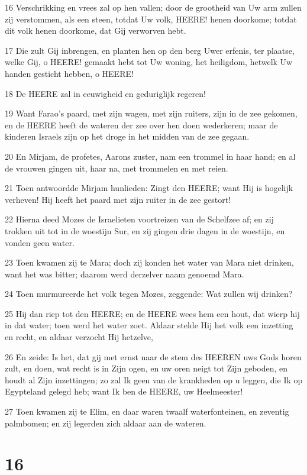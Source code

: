 \par 16 Verschrikking en vrees zal op hen vallen; door de grootheid van Uw arm zullen zij verstommen, als een steen, totdat Uw volk, HEERE! henen doorkome; totdat dit volk henen doorkome, dat Gij verworven hebt.
\par 17 Die zult Gij inbrengen, en planten hen op den berg Uwer erfenis, ter plaatse, welke Gij, o HEERE! gemaakt hebt tot Uw woning, het heiligdom, hetwelk Uw handen gesticht hebben, o HEERE!
\par 18 De HEERE zal in eeuwigheid en geduriglijk regeren!
\par 19 Want Farao's paard, met zijn wagen, met zijn ruiters, zijn in de zee gekomen, en de HEERE heeft de wateren der zee over hen doen wederkeren; maar de kinderen Israels zijn op het droge in het midden van de zee gegaan.
\par 20 En Mirjam, de profetes, Aarons zuster, nam een trommel in haar hand; en al de vrouwen gingen uit, haar na, met trommelen en met reien.
\par 21 Toen antwoordde Mirjam hunlieden: Zingt den HEERE; want Hij is hogelijk verheven! Hij heeft het paard met zijn ruiter in de zee gestort!
\par 22 Hierna deed Mozes de Israelieten voortreizen van de Schelfzee af; en zij trokken uit tot in de woestijn Sur, en zij gingen drie dagen in de woestijn, en vonden geen water.
\par 23 Toen kwamen zij te Mara; doch zij konden het water van Mara niet drinken, want het was bitter; daarom werd derzelver naam genoemd Mara.
\par 24 Toen murmureerde het volk tegen Mozes, zeggende: Wat zullen wij drinken?
\par 25 Hij dan riep tot den HEERE; en de HEERE wees hem een hout, dat wierp hij in dat water; toen werd het water zoet. Aldaar stelde Hij het volk een inzetting en recht, en aldaar verzocht Hij hetzelve,
\par 26 En zeide: Is het, dat gij met ernst naar de stem des HEEREN uws Gods horen zult, en doen, wat recht is in Zijn ogen, en uw oren neigt tot Zijn geboden, en houdt al Zijn inzettingen; zo zal Ik geen van de krankheden op u leggen, die Ik op Egypteland gelegd heb; want Ik ben de HEERE, uw Heelmeester!
\par 27 Toen kwamen zij te Elim, en daar waren twaalf waterfonteinen, en zeventig palmbomen; en zij legerden zich aldaar aan de wateren.

\chapter{16}


